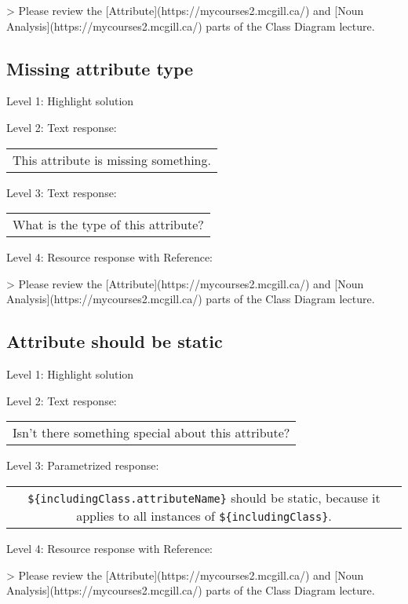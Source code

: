 > Please review the [Attribute](https://mycourses2.mcgill.ca/) and [Noun Analysis](https://mycourses2.mcgill.ca/) parts of the Class Diagram lecture.


\subsection{Missing attribute type}

\noindent Level 1: Highlight solution \medskip

\noindent Level 2: Text response: \medskip

\begin{tabular}{|c}
This attribute is missing something.
\end{tabular} \medskip

\noindent Level 3: Text response: \medskip

\begin{tabular}{|c}
What is the type of this attribute?
\end{tabular} \medskip

\noindent Level 4: Resource response with Reference:

> Please review the [Attribute](https://mycourses2.mcgill.ca/) and [Noun Analysis](https://mycourses2.mcgill.ca/) parts of the Class Diagram lecture.


\subsection{Attribute should be static}

\noindent Level 1: Highlight solution \medskip

\noindent Level 2: Text response: \medskip

\begin{tabular}{|c}
Isn't there something special about this attribute?
\end{tabular} \medskip

\noindent Level 3: Parametrized response: \medskip

\begin{tabular}{|c}
\verb|${includingClass.attributeName}| should be static, because it applies to all instances of \verb|${includingClass}|.
\end{tabular} \medskip

\noindent Level 4: Resource response with Reference:

> Please review the [Attribute](https://mycourses2.mcgill.ca/) and [Noun Analysis](https://mycourses2.mcgill.ca/) parts of the Class Diagram lecture.


